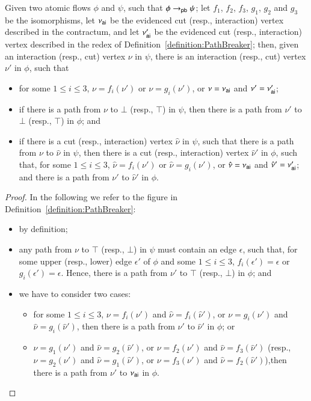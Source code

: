 
\begin{lemma}\label{lemma:PathBreaker}
Given two atomic flows $\phi$ and $\psi$, such that $\phi\to_{\mathsf{pb}}\psi$; let $f_1$, $f_2$, $f_3$, $g_1$, $g_2$ and $g_3$ be the isomorphisms, let $\nu_{\mathsf{ai}}$ be the evidenced cut (resp., interaction) vertex described in the contractum, and let $\nu'_{\mathsf{ai}}$ be the evidenced cut (resp., interaction) vertex described in the redex of Definition~\ref{definition:PathBreaker}; then, given an interaction (resp., cut) vertex $\nu$ in $\psi$, there is an interaction (resp., cut) vertex $\nu'$ in $\phi$, such that
\begin{itemize}
\item for some $1\le i\le 3$, $\nu=f_i(\nu')$ or $\nu=g_i(\nu')$, or $\nu=\nu_{\mathsf{ai}}$ and $\nu'=\nu'_{\mathsf{ai}}$;
\item if there is a path from $\nu$ to $\bot$ (resp., $\top$) in $\psi$, then there is a path from $\nu'$ to $\bot$ (resp., $\top$) in $\phi$; and
\item if there is a cut (resp., interaction) vertex $\hat\nu$ in $\psi$, such that there is a path from $\nu$ to $\hat\nu$ in $\psi$, then there is a cut (resp., interaction) vertex $\hat\nu'$ in $\phi$, such that, for some $1\le i\le 3$, $\hat\nu=f_i(\nu')$ or $\hat\nu=g_i(\nu')$, or $\hat\nu=\nu_{\mathsf{ai}}$ and $\hat\nu'=\nu'_{\mathsf{ai}}$; and there is a path from $\nu'$ to $\hat\nu'$ in $\phi$.
\end{itemize}
\end{lemma}

\begin{proof}
In the following we refer to the figure in Definition~\ref{definition:PathBreaker}:
\begin{itemize}
  \item by definition;
  \item any path from $\nu$ to $\top$ (resp., $\bot$) in $\psi$ must contain an edge $\epsilon$, such that, for some upper (resp., lower) edge $\epsilon'$ of $\phi$ and some $1\le i\le 3$, $f_i(\epsilon')=\epsilon$ or $g_i(\epsilon')=\epsilon$. Hence, there is a path from $\nu'$ to $\top$ (resp., $\bot$) in $\phi$; and
 \item we have to consider two cases:
 \begin{itemize}
  \item for some $1\le i\le 3$, $\nu=f_i(\nu')$ and $\hat\nu=f_i(\hat\nu')$, or $\nu=g_i(\nu')$ and $\hat\nu=g_i(\hat\nu')$, then there is a path from $\nu'$ to $\hat\nu'$ in $\phi$; or
  \item $\nu=g_1(\nu')$ and $\hat\nu=g_2(\hat\nu')$, or $\nu=f_2(\nu')$ and $\hat\nu=f_3(\hat\nu')$ (resp., $\nu=g_2(\nu')$ and $\hat\nu=g_1(\hat\nu')$, or $\nu=f_3(\nu')$ and $\hat\nu=f_2(\hat\nu')$),then there is a path from $\nu'$ to $\nu_{\mathsf{ai}}$ in $\phi$.
 \end{itemize}
\end{itemize}
\end{proof}

